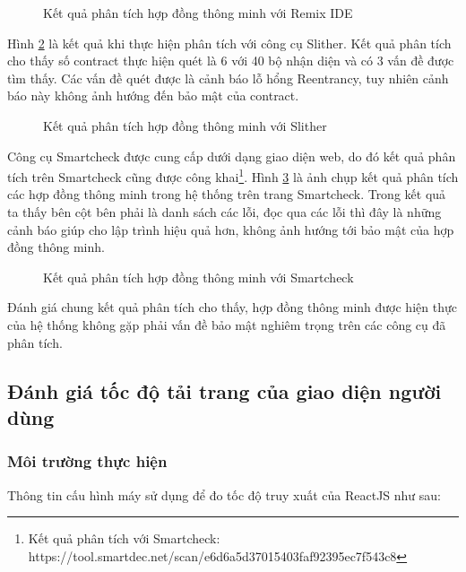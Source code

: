 \documentclass[../main-report.tex]{subfiles}
\begin{document}
\begin{figure}[ht!]
\begin{center}
\label{fig:result-remix-ide}
\caption{Kết quả phân tích hợp đồng thông minh với Remix IDE}
\end{center}
\end{figure}

Hình \ref{fig:result-slither} là kết quả khi thực hiện phân tích với công cụ Slither. Kết quả phân tích cho thấy số contract thực hiện quét là 6 với 40 bộ nhận diện và có 3 vấn đề được tìm thấy. Các vấn đề quét được là cảnh báo lỗ hổng Reentrancy, tuy nhiên cảnh báo này không ảnh hướng đến bảo mật của contract.

\begin{figure}[ht!]
\begin{center}
\label{fig:result-slither}
\caption{Kết quả phân tích hợp đồng thông minh với Slither}
\end{center}
\end{figure}

Công cụ Smartcheck được cung cấp dưới dạng giao diện web, do đó kết quả phân tích trên Smartcheck cũng được công khai\footnote{Kết quả phân tích với Smartcheck: https://tool.smartdec.net/scan/e6d6a5d37015403faf92395ec7f543c8}. Hình \ref{fig:result-smartcheck} là ảnh chụp kết quả phân tích các hợp đồng thông minh trong hệ thống trên trang Smartcheck. Trong kết quả ta thấy bên cột bên phải là danh sách các lỗi, đọc qua các lỗi thì đây là những cảnh báo giúp cho lập trình hiệu quả hơn, không ảnh hướng tới bảo mật của hợp đồng thông minh.

\begin{figure}[ht!]
\begin{center}
\label{fig:result-smartcheck}
\caption{Kết quả phân tích hợp đồng thông minh với Smartcheck}
\end{center}
\end{figure}

Đánh giá chung kết quả phân tích cho thấy, hợp đồng thông minh được hiện thực của hệ thống không gặp phải vấn đề bảo mật nghiêm trọng trên các công cụ đã phân tích.

\subsection{Đánh giá tốc độ tải trang của giao diện người dùng}
\subsubsection{Môi trường thực hiện}
Thông tin cấu hình máy sử dụng để đo tốc độ truy xuất của ReactJS như sau:
\end{document}
